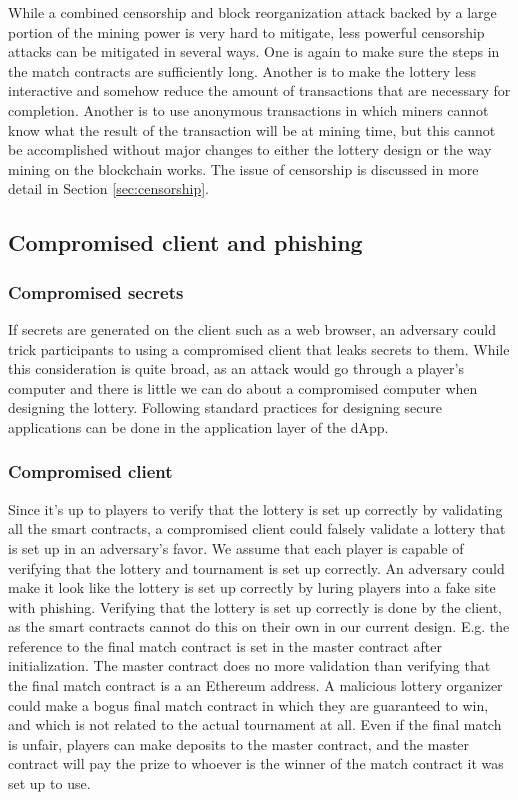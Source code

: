 While a combined censorship and block reorganization attack backed by a large portion of the mining power is very hard to mitigate, less powerful censorship attacks can be mitigated in several ways. One is again to make sure the steps in the match contracts are sufficiently long. Another is to make the lottery less interactive and somehow reduce the amount of transactions that are necessary for completion. Another is to use anonymous transactions in which miners cannot know what the result of the transaction will be at mining time, but this cannot be accomplished without major changes to either the lottery design or the way mining on the blockchain works. The issue of censorship is discussed in more detail in Section \ref{sec:censorship}.

\subsection{Compromised client and phishing}

\subsubsection{Compromised secrets}
If secrets are generated on the client such as a web browser, an adversary could trick participants to using a compromised client that leaks secrets to them. While this consideration is quite broad, as an attack would go through a player's computer and there is little we can do about a compromised computer when designing the lottery. Following standard practices for designing secure applications can be done in the application layer of the dApp.

\subsubsection{Compromised client}
Since it's up to players to verify that the lottery is set up correctly by validating all the smart contracts, a compromised client could falsely validate a lottery that is set up in an adversary's favor. We assume that each player is capable of verifying that the lottery and tournament is set up correctly. An adversary could make it look like the lottery is set up correctly by luring players into a fake site with phishing. Verifying that the lottery is set up correctly is done by the client, as the smart contracts cannot do this on their own in our current design. E.g. the reference to the final match contract is set in the master contract after initialization. The master contract does no more validation than verifying that the final match contract is a an Ethereum address. A malicious lottery organizer could make a bogus final match contract in which they are guaranteed to win, and which is not related to the actual tournament at all. Even if the final match is unfair, players can make deposits to the master contract, and the master contract will pay the prize to whoever is the winner of the match contract it was set up to use.

